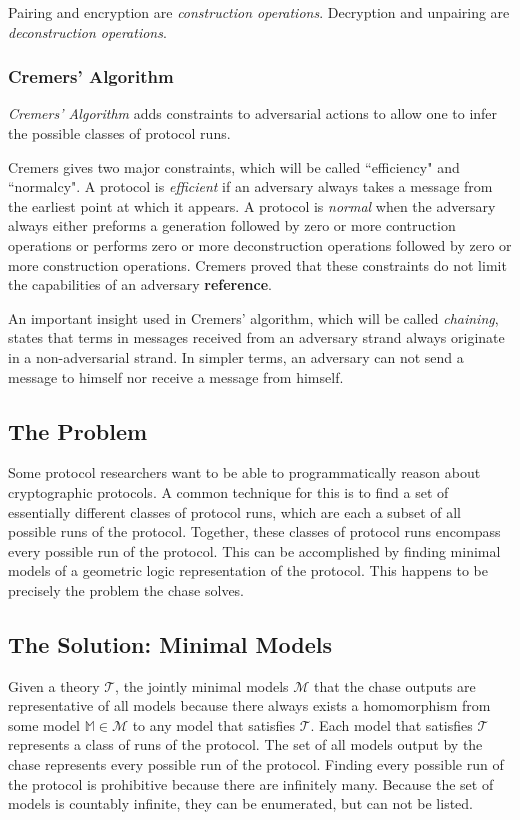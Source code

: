 				Pairing and encryption are \emph{construction operations}.
				Decryption and unpairing are \emph{deconstruction operations}.

		\subsubsection{Cremers' Algorithm}

			\emph{Cremers' Algorithm} adds constraints to adversarial actions
			to allow one to infer the possible classes of protocol runs.

			Cremers gives two major constraints, which will be called
			``efficiency" and ``normalcy". A protocol is \emph{efficient} if an
			adversary always takes a message from the earliest point at which
			it appears. A protocol is \emph{normal} when the adversary always
			either preforms a generation followed by zero or more contruction
			operations or performs zero or more deconstruction operations
			followed by zero or more construction operations. Cremers proved
			that these constraints do not limit the capabilities of an
			adversary \textbf{reference}.

			An important insight used in Cremers' algorithm, which will be
			called \emph{chaining}, states that terms in messages received from
			an adversary strand always originate in a non-adversarial strand.
			In simpler terms, an adversary can not send a message to himself
			nor receive a message from himself.

	\subsection{The Problem}

		Some protocol researchers want to be able to programmatically reason
		about cryptographic protocols. A common technique for this is to find a
		set of essentially different classes of protocol runs, which are each a
		subset of all possible runs of the protocol. Together, these classes of
		protocol runs encompass every possible run of the protocol. This can be
		accomplished by finding minimal models of a geometric logic
		representation of the protocol. This happens to be precisely the
		problem the chase solves.

	\subsection{The Solution: Minimal Models}

		Given a theory $\mathcal{T}$, the jointly minimal models $\mathcal{M}$
		that the chase outputs are representative of all models because there
		always exists a homomorphism from some model $\mathbb{M} \in
		\mathcal{M}$ to any model that satisfies $\mathcal{T}$. Each model that
		satisfies $\mathcal{T}$ represents a class of runs of the protocol. The
		set of all models output by the chase represents every possible run of
		the protocol. Finding every possible run of the protocol is prohibitive
		because there are infinitely many. Because the set of models is
		countably infinite, they can be enumerated, but can not be listed.

